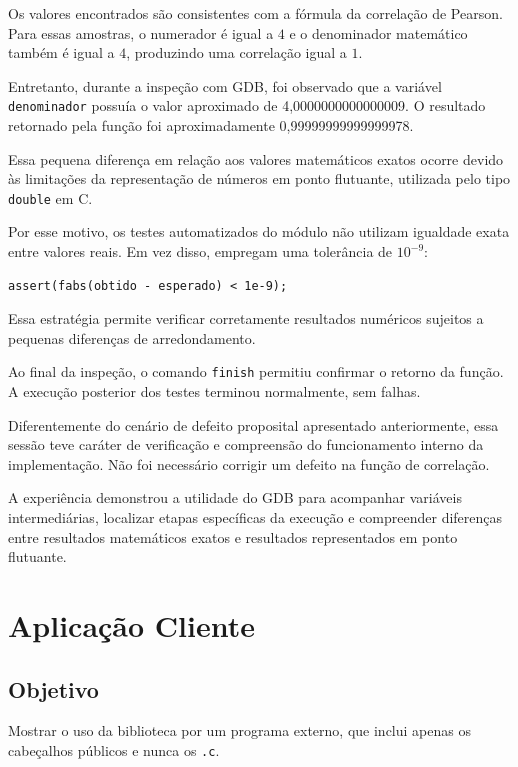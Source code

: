 \documentclass[12pt,a4paper]{article}
\newcommand{\cod}[1]{\texttt{#1}}
\begin{document}
Os valores encontrados são consistentes com a fórmula
da correlação de Pearson. Para essas amostras, o
numerador é igual a $4$ e o denominador matemático
também é igual a $4$, produzindo uma correlação igual
a $1$.

Entretanto, durante a inspeção com GDB, foi observado
que a variável \cod{denominador} possuía o valor
aproximado de 4,0000000000000009. O resultado retornado
pela função foi aproximadamente
0,99999999999999978.

Essa pequena diferença em relação aos valores
matemáticos exatos ocorre devido às limitações da
representação de números em ponto flutuante,
utilizada pelo tipo \cod{double} em C.

Por esse motivo, os testes automatizados do módulo
não utilizam igualdade exata entre valores reais.
Em vez disso, empregam uma tolerância de $10^{-9}$:

\begin{lstlisting}
assert(fabs(obtido - esperado) < 1e-9);
\end{lstlisting}

Essa estratégia permite verificar corretamente
resultados numéricos sujeitos a pequenas diferenças
de arredondamento.

Ao final da inspeção, o comando \cod{finish} permitiu
confirmar o retorno da função. A execução posterior
dos testes terminou normalmente, sem falhas.

Diferentemente do cenário de defeito proposital
apresentado anteriormente, essa sessão teve caráter
de verificação e compreensão do funcionamento interno
da implementação. Não foi necessário corrigir um
defeito na função de correlação.

A experiência demonstrou a utilidade do GDB para
acompanhar variáveis intermediárias, localizar etapas
específicas da execução e compreender diferenças
entre resultados matemáticos exatos e resultados
representados em ponto flutuante.

\section{Aplicação Cliente}

\subsection{Objetivo}
Mostrar o uso da biblioteca por um programa externo, que inclui apenas os
cabeçalhos públicos e nunca os \cod{.c}.
\end{document}
